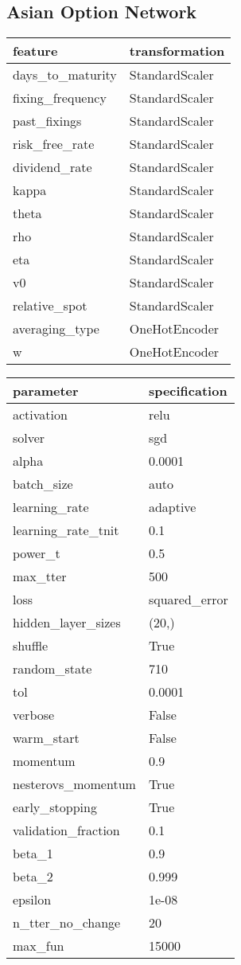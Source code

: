 \begin{minipage}{0.45\textwidth}
	\subsection{Asian Option Network}
	\label{sections:AsianNet}
	\centering
	\begin{tabular}{ll}
		\toprule
		feature & transformation \\
		\midrule
		days\_to\_maturity & StandardScaler \\
		fixing\_frequency & StandardScaler \\
		past\_fixings & StandardScaler \\
		risk\_free\_rate & StandardScaler \\
		dividend\_rate & StandardScaler \\
		kappa & StandardScaler \\
		theta & StandardScaler \\
		rho & StandardScaler \\
		eta & StandardScaler \\
		v0 & StandardScaler \\
		relative\_spot & StandardScaler \\
		averaging\_type & OneHotEncoder \\
		w & OneHotEncoder \\
		\bottomrule
	\end{tabular}
	
	\vspace{0.5em}
	\begin{tabular}{ll}
		\toprule
		parameter & specification \\
		\midrule
		activation & relu \\
		solver & sgd \\
		alpha & 0.0001 \\
		batch_size & auto \\
		learning_rate & adaptive \\
		learning_rate_{t}nit & 0.1 \\
		power_t & 0.5 \\
		max_{t}ter & 500 \\
		loss & squared_error \\
		hidden_layer_sizes & (20,) \\
		shuffle & True \\
		random_state & 710 \\
		tol & 0.0001 \\
		verbose & False \\
		warm_start & False \\
		momentum & 0.9 \\
		nesterovs_momentum & True \\
		early_stopping & True \\
		validation_fraction & 0.1 \\
		beta_1 & 0.9 \\
		beta_2 & 0.999 \\
		epsilon & 1e-08 \\
		n_{t}ter_no_change & 20 \\
		max_fun & 15000 \\
		\bottomrule
	\end{tabular}
\end{minipage}
